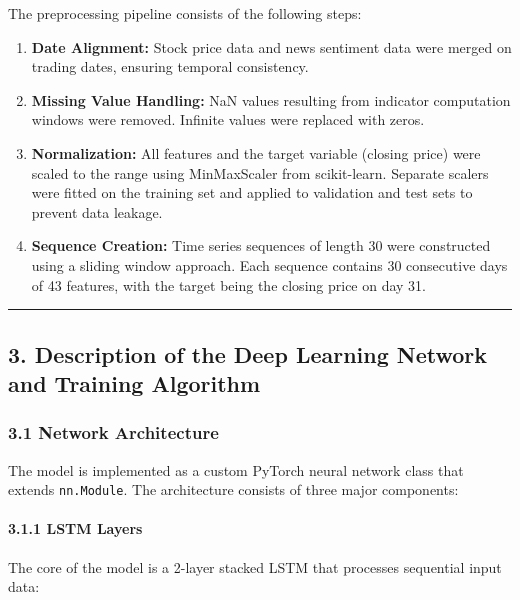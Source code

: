 \documentclass[
]{article}
\begin{document}
The preprocessing pipeline consists of the following steps:

\begin{enumerate}
\def\labelenumi{\arabic{enumi}.}
\item
  \textbf{Date Alignment:} Stock price data and news sentiment data were
  merged on trading dates, ensuring temporal consistency.
\item
  \textbf{Missing Value Handling:} NaN values resulting from indicator
  computation windows were removed. Infinite values were replaced with
  zeros.
\item
  \textbf{Normalization:} All features and the target variable (closing
  price) were scaled to the range using MinMaxScaler from scikit-learn.
  Separate scalers were fitted on the training set and applied to
  validation and test sets to prevent data leakage.
\item
  \textbf{Sequence Creation:} Time series sequences of length 30 were
  constructed using a sliding window approach. Each sequence contains 30
  consecutive days of 43 features, with the target being the closing
  price on day 31.
\end{enumerate}

\begin{center}\rule{0.5\linewidth}{0.5pt}\end{center}

\subsection{3. Description of the Deep Learning Network and Training
Algorithm}\label{3-description-of-the-deep-learning-network-and-training-algorithm}

\subsubsection{3.1 Network Architecture}\label{31-network-architecture}

The model is implemented as a custom PyTorch neural network class that
extends \texttt{nn.Module}. The architecture consists of three major
components:

\paragraph{3.1.1 LSTM Layers}\label{311-lstm-layers}

The core of the model is a 2-layer stacked LSTM that processes
sequential input data:
\end{document}

